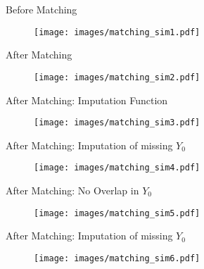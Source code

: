 \documentclass{beamer}
\numberwithin{equation}{section}
\begin{document}
\begin{frame}{Before Matching}
\vspace{-.3in}
\begin{figure}[ht] \centering
    \texttt{[image: images/matching\_sim1.pdf]}
\end{figure}

\end{frame}

\begin{frame}{After Matching}
\vspace{-.3in}
\begin{figure}[ht] \centering
    \texttt{[image: images/matching\_sim2.pdf]}
\end{figure}

\end{frame}

\begin{frame}{After Matching: Imputation Function}
\vspace{-.3in}
\begin{figure}[ht] \centering
    \texttt{[image: images/matching\_sim3.pdf]}
\end{figure}

\end{frame}

\begin{frame}{After Matching: Imputation of missing $Y_0$}
\vspace{-.3in}
\begin{figure}[ht] \centering
    \texttt{[image: images/matching\_sim4.pdf]}
\end{figure}

\end{frame}

\begin{frame}{After Matching: No Overlap in $Y_0$}
\vspace{-.3in}
\begin{figure}[ht] \centering
    \texttt{[image: images/matching\_sim5.pdf]}
\end{figure}

\end{frame}

\begin{frame}{After Matching: Imputation of missing $Y_0$}
\vspace{-.3in}
\begin{figure}[ht] \centering
    \texttt{[image: images/matching\_sim6.pdf]}
\end{figure}

\end{frame}
\end{document}
